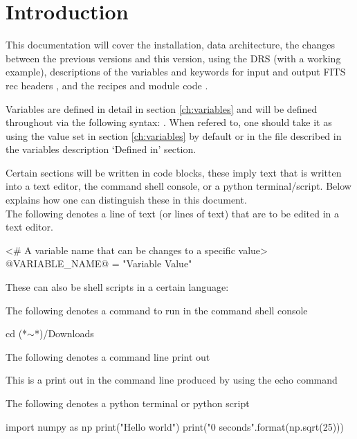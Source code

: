 \chapter{Introduction}
\label{chapter:intro}

This documentation will cover the installation, data architecture, \ifdevguide the changes between the previous versions and this version\fi, using the DRS (with a working example), descriptions of the variables \ifdevguide and keywords for input and output FITS rec headers \fi, and the recipes \ifdevguide and module code \fi.

\noindent Variables are defined in detail in section \ref{ch:variables} and will be defined throughout via the following syntax: . When refered to, one should take it as using the value set in section \ref{ch:variables} by default or in the file described in the variables description `Defined in' section.

\noindent Certain sections will be written in code blocks, these imply text that is written into a text editor, the command shell console, or a python terminal/script. Below explains how one can distinguish these in this document. \\

\noindent The following denotes a line of text (or lines of text) that are to be edited in a text editor.
\begin{textbox}
<# A variable name that can be changes to a specific value>
@VARIABLE_NAME@ = "Variable Value"
\end{textbox}
\vspace{0.5cm}

\noindent These can also be shell scripts in a certain language:
\vspace{0.5cm}

\noindent The following denotes a command to run in the command shell console 
\begin{cmdbox}
cd (*$\sim$*)/Downloads
\end{cmdbox}
\vspace{0.5cm}

\noindent The following denotes a command line print out
\begin{cmdboxprint}
 This is a print out in the command line
 produced by using the echo command
\end{cmdboxprint}
\vspace{0.5cm}

\noindent The following denotes a python terminal or python script
\begin{pythonbox}
import numpy as np
print("Hello world")
print("{0} seconds".format(np.sqrt(25)))
\end{pythonbox}
\vspace{0.5cm}